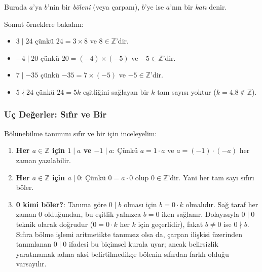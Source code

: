 Burada $a$'ya $b$'nin bir \emph{böleni} (veya çarpanı), $b$'ye ise $a$'nın bir \emph{katı} denir.

Somut örneklere bakalım:
\begin{itemize}
    \item $3 \mid 24$ çünkü $24 = 3 \times 8$ ve $8 \in \mathbb{Z}$'dir.
    \item $-4 \mid 20$ çünkü $20 = (-4) \times (-5)$ ve $-5 \in \mathbb{Z}$'dir.
    \item $7 \mid -35$ çünkü $-35 = 7 \times (-5)$ ve $-5 \in \mathbb{Z}$'dir.
    \item $5 \nmid 24$ çünkü $24 = 5k$ eşitliğini sağlayan bir $k$ tam sayısı yoktur ($k = 4.8 \notin \mathbb{Z}$).
\end{itemize}

\begin{figure}[h!]
\centering
{}
\end{figure}

\subsubsection{Uç Değerler: Sıfır ve Bir}
Bölünebilme tanımını sıfır ve bir için inceleyelim:
\begin{enumerate}
    \item \textbf{Her $a \in \mathbb{Z}$ için $1 \mid a$ ve $-1 \mid a$}: Çünkü $a = 1 \cdot a$ ve $a = (-1) \cdot (-a)$ her zaman yazılabilir.
    \item \textbf{Her $a \in \mathbb{Z}$ için $a \mid 0$}: Çünkü $0 = a \cdot 0$ olup $0 \in \mathbb{Z}$'dir. Yani her tam sayı sıfırı böler.
    \item \textbf{0 kimi böler?}: Tanıma göre $0 \mid b$ olması için $b = 0 \cdot k$ olmalıdır. Sağ taraf her zaman 0 olduğundan, bu eşitlik yalnızca $b = 0$ iken sağlanır. Dolayısıyla $0 \mid 0$ teknik olarak doğrudur ($0 = 0 \cdot k$ her $k$ için geçerlidir), fakat $b \neq 0$ ise $0 \nmid b$. Sıfıra bölme işlemi aritmetikte tanımsız olsa da, çarpan ilişkisi üzerinden tanımlanan $0 \mid 0$ ifadesi bu biçimsel kurala uyar; ancak belirsizlik yaratmamak adına aksi belirtilmedikçe bölenin sıfırdan farklı olduğu varsayılır.
\end{enumerate}

